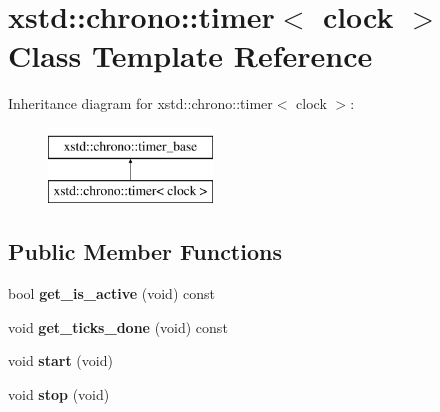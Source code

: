 \hypertarget{classxstd_1_1chrono_1_1timer}{\section{xstd\-:\-:chrono\-:\-:timer$<$ clock $>$ Class Template Reference}
\label{classxstd_1_1chrono_1_1timer}
}
Inheritance diagram for xstd\-:\-:chrono\-:\-:timer$<$ clock $>$\-:\begin{figure}[H]
\begin{center}
\leavevmode
\includegraphics[height=2.000000cm]{classxstd_1_1chrono_1_1timer}
\end{center}
\end{figure}
\subsection*{Public Member Functions}
\begin{DoxyCompactItemize}
\item 
\hypertarget{classxstd_1_1chrono_1_1timer_a1496749b90d70cee8c29c66f9c67e21a}{bool {\bfseries get\-\_\-is\-\_\-active} (void) const }\label{classxstd_1_1chrono_1_1timer_a1496749b90d70cee8c29c66f9c67e21a}

\item 
\hypertarget{classxstd_1_1chrono_1_1timer_a6ad3088df2f2ca33ea7246f1c716b65a}{void {\bfseries get\-\_\-ticks\-\_\-done} (void) const }\label{classxstd_1_1chrono_1_1timer_a6ad3088df2f2ca33ea7246f1c716b65a}

\item 
\hypertarget{classxstd_1_1chrono_1_1timer_a66a27994093e3a8cd5be70e82e577e25}{void {\bfseries start} (void)}\label{classxstd_1_1chrono_1_1timer_a66a27994093e3a8cd5be70e82e577e25}

\item 
\hypertarget{classxstd_1_1chrono_1_1timer_acb361a9fbbafe351513ee6251feb1000}{void {\bfseries stop} (void)}\label{classxstd_1_1chrono_1_1timer_acb361a9fbbafe351513ee6251feb1000}

\end{DoxyCompactItemize}
